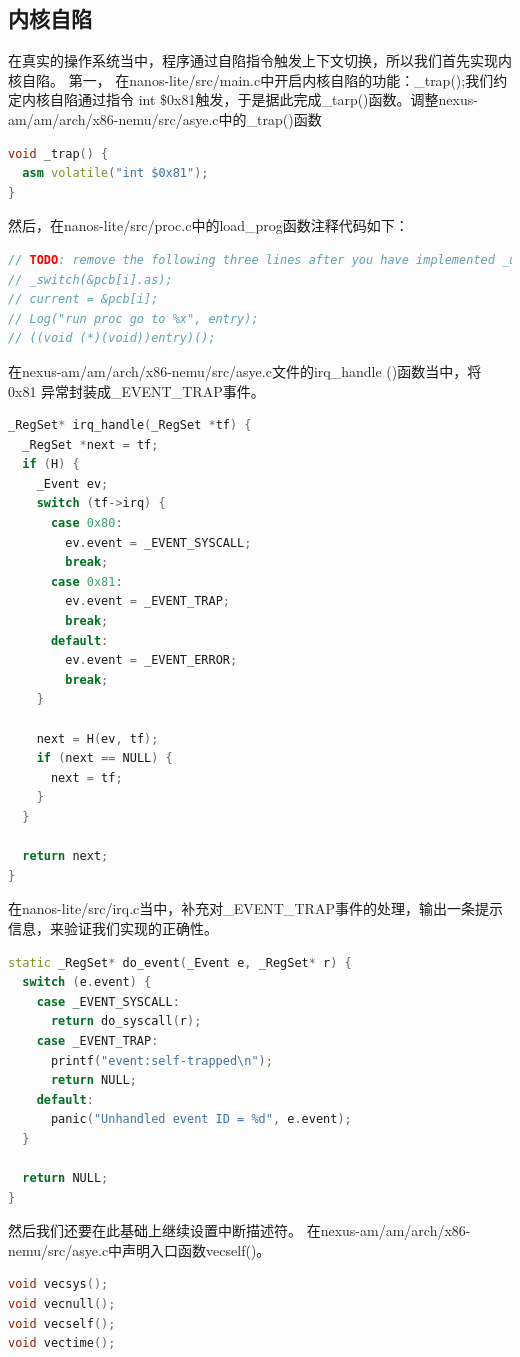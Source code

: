 \documentclass[UTF8,a4paper,10pt]{ctexart}
\begin{document}
\subsection{内核自陷}
在真实的操作系统当中，程序通过自陷指令触发上下文切换，所以我们首先实现内核自陷。
第一，	在nanos-lite/src/main.c中开启内核自陷的功能：\_trap();我们约定内核自陷通过指令 int \$0x81触发，于是据此完成\_tarp()函数。调整nexus-am/am/arch/x86-nemu/src/asye.c中的\_trap()函数
\begin{lstlisting}[language = C++]
void _trap() {
  asm volatile("int $0x81");
}
\end{lstlisting}
然后，在nanos-lite/src/proc.c中的load\_prog函数注释代码如下：
\begin{lstlisting}[language = C++]
// TODO: remove the following three lines after you have implemented _umake()
// _switch(&pcb[i].as);
// current = &pcb[i];
// Log("run proc go to %x", entry);
// ((void (*)(void))entry)();
\end{lstlisting}
在nexus-am/am/arch/x86-nemu/src/asye.c文件的irq\_handle ()函数当中，将 0x81 异常封装成\_EVENT\_TRAP事件。
\begin{lstlisting}[language = C++]
_RegSet* irq_handle(_RegSet *tf) {
  _RegSet *next = tf;
  if (H) {
    _Event ev;
    switch (tf->irq) {
      case 0x80: 
        ev.event = _EVENT_SYSCALL; 
        break;
      case 0x81:
        ev.event = _EVENT_TRAP;
        break;
      default: 
        ev.event = _EVENT_ERROR; 
        break;
    }

    next = H(ev, tf);
    if (next == NULL) {
      next = tf;
    }
  }

  return next;
}
\end{lstlisting}

在nanos-lite/src/irq.c当中，补充对\_EVENT\_TRAP事件的处理，输出一条提示信息，来验证我们实现的正确性。
\begin{lstlisting}[language = C++]
static _RegSet* do_event(_Event e, _RegSet* r) {
  switch (e.event) {
    case _EVENT_SYSCALL:
      return do_syscall(r);
    case _EVENT_TRAP:
      printf("event:self-trapped\n");
      return NULL;
    default: 
      panic("Unhandled event ID = %d", e.event);
  }

  return NULL;
}
\end{lstlisting}
然后我们还要在此基础上继续设置中断描述符。
在nexus-am/am/arch/x86-nemu/src/asye.c中声明入口函数vecself()。
\begin{lstlisting}[language = C++]
void vecsys();
void vecnull();
void vecself();
void vectime();
\end{lstlisting}
\end{document}
